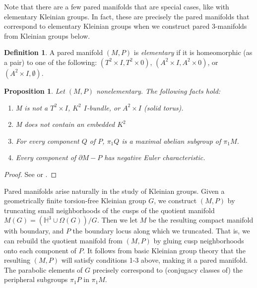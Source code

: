 \documentclass[12pt]{amsart}
\newtheorem{prop}[theorem]{Proposition}
\theoremstyle{definition}
\newtheorem{Def}[theorem]{Definition}
\theoremstyle{remark}
\newcommand{\x}{\times}
\newcommand{\bd}{\partial}
\newcommand{\Om}{\Omega}
\begin{document}
Note that there are a few pared manifolds that are special cases, like with
elementary Kleinian groups. In fact, these are precisely the pared manifolds
that correspond to elementary Kleinian groups when we construct pared
3-manifolds from Kleinian groups below.

\begin{Def}

A pared manifold $(M,P)$ is \emph{elementary} if it is homeomorphic (as a pair)
to one of the following: $(T^2\x I,T^2\x 0)$, $(A^2\x I,A^2\x 0)$, or $(A^2\x
I,\emptyset)$.

\end{Def}

\begin{prop}

Let $(M,P)$ nonelementary. The following facts hold:

\begin{enumerate}
\item M is not a $T^2\x I$, $K^2$ $I$-bundle, or $A^2\x I$ (solid torus).
\item M does not contain an embedded $K^2$
\item For every component $Q$ of $P$, $\pi_1Q$ is a maximal abelian subgroup of
$\pi_1M$.
\item Every component of $\bd M-P$ has negative Euler characteristic.
\end{enumerate}

\end{prop}
\begin{proof}
See \cite{CMc} or \cite{Mo}.
\end{proof}

Pared manifolds arise naturally in the study of Kleinian groups. Given
a geometrically finite torsion-free Kleinian group $G$, we construct $(M,P)$ by
truncating small neighborhoods of the cusps of the quotient manifold $M(G)
= \left(\mathbb{H}^3\cup \Om(G)\right)/G$.  Then we let $M$ be the resulting
compact manifold with boundary, and $P$ the boundary locus along which we
truncated.  That is, we can rebuild the quotient manifold from $(M,P)$ by
gluing cusp neighborhoods onto each component of $P$. It follows from basic
Kleinian group theory that the resulting $(M,P)$ will satisfy conditions 1-3
above, making it a pared manifold.  The parabolic elements of $G$ precisely
correspond to (conjugacy classes of) the peripheral subgroups $\pi_1P$ in
$\pi_1M$.
\end{document}
